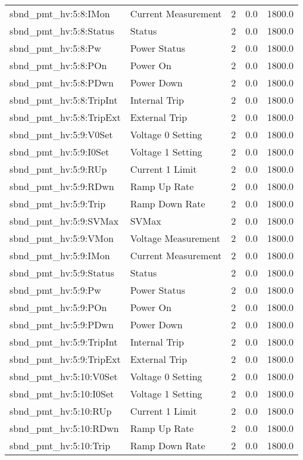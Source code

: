 \begin{center}
\begin{longtable}{l | l l l l }
sbnd\_pmt\_hv:5:8:IMon & Current Measurement & 2 & 0.0 & 1800.0\\ 
sbnd\_pmt\_hv:5:8:Status & Status & 2 & 0.0 & 1800.0\\ 
sbnd\_pmt\_hv:5:8:Pw & Power Status & 2 & 0.0 & 1800.0\\ 
sbnd\_pmt\_hv:5:8:POn & Power On & 2 & 0.0 & 1800.0\\ 
sbnd\_pmt\_hv:5:8:PDwn & Power Down & 2 & 0.0 & 1800.0\\ 
sbnd\_pmt\_hv:5:8:TripInt & Internal Trip & 2 & 0.0 & 1800.0\\ 
sbnd\_pmt\_hv:5:8:TripExt & External Trip & 2 & 0.0 & 1800.0\\ 
sbnd\_pmt\_hv:5:9:V0Set & Voltage 0 Setting & 2 & 0.0 & 1800.0\\ 
sbnd\_pmt\_hv:5:9:I0Set & Voltage 1 Setting & 2 & 0.0 & 1800.0\\ 
sbnd\_pmt\_hv:5:9:RUp & Current 1 Limit & 2 & 0.0 & 1800.0\\ 
sbnd\_pmt\_hv:5:9:RDwn & Ramp Up Rate & 2 & 0.0 & 1800.0\\ 
sbnd\_pmt\_hv:5:9:Trip & Ramp Down Rate & 2 & 0.0 & 1800.0\\ 
sbnd\_pmt\_hv:5:9:SVMax & SVMax & 2 & 0.0 & 1800.0\\ 
sbnd\_pmt\_hv:5:9:VMon & Voltage Measurement & 2 & 0.0 & 1800.0\\ 
sbnd\_pmt\_hv:5:9:IMon & Current Measurement & 2 & 0.0 & 1800.0\\ 
sbnd\_pmt\_hv:5:9:Status & Status & 2 & 0.0 & 1800.0\\ 
sbnd\_pmt\_hv:5:9:Pw & Power Status & 2 & 0.0 & 1800.0\\ 
sbnd\_pmt\_hv:5:9:POn & Power On & 2 & 0.0 & 1800.0\\ 
sbnd\_pmt\_hv:5:9:PDwn & Power Down & 2 & 0.0 & 1800.0\\ 
sbnd\_pmt\_hv:5:9:TripInt & Internal Trip & 2 & 0.0 & 1800.0\\ 
sbnd\_pmt\_hv:5:9:TripExt & External Trip & 2 & 0.0 & 1800.0\\ 
sbnd\_pmt\_hv:5:10:V0Set & Voltage 0 Setting & 2 & 0.0 & 1800.0\\ 
sbnd\_pmt\_hv:5:10:I0Set & Voltage 1 Setting & 2 & 0.0 & 1800.0\\ 
sbnd\_pmt\_hv:5:10:RUp & Current 1 Limit & 2 & 0.0 & 1800.0\\ 
sbnd\_pmt\_hv:5:10:RDwn & Ramp Up Rate & 2 & 0.0 & 1800.0\\ 
sbnd\_pmt\_hv:5:10:Trip & Ramp Down Rate & 2 & 0.0 & 1800.0\\ 

\end{longtable}
\end{center}
